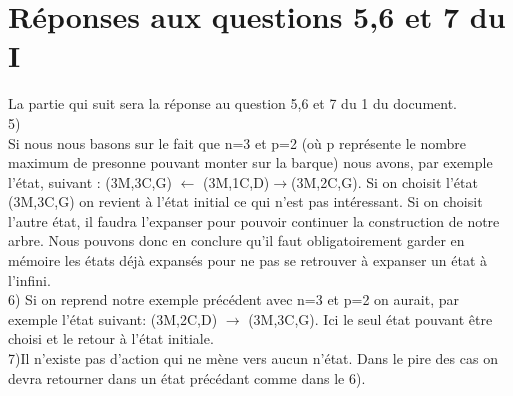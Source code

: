 \documentclass[a4paper, 12pt, french, oneside]{book}
\begin{document}
\section{Réponses aux questions 5,6 et 7 du I}
La partie qui suit sera la réponse au question 5,6 et 7 du 1 du document. \\
5) \\
Si nous nous  basons sur le fait que n=3 et p=2 (où p représente le nombre maximum de presonne pouvant monter sur la barque) nous avons, par exemple l'état, suivant :
(3M,3C,G) $\leftarrow$ (3M,1C,D)$\rightarrow$(3M,2C,G). Si on choisit l'état (3M,3C,G) on revient à l'état initial ce qui n'est pas intéressant. Si on choisit l'autre état, il faudra l'expanser pour pouvoir continuer la construction de notre arbre. Nous pouvons donc en conclure qu'il faut obligatoirement garder en mémoire les états déjà expansés pour ne pas se retrouver à expanser un état à l'infini.\\
6) Si on reprend notre exemple précédent avec n=3 et p=2 on aurait, par exemple l'état suivant: (3M,2C,D) $\rightarrow$ (3M,3C,G). Ici le seul état pouvant être choisi et le retour à l'état initiale.\\
7)Il n'existe pas d'action qui ne mène vers aucun n'état. Dans le pire des cas on devra retourner dans un état précédant comme dans le 6). \\
\end{document}
